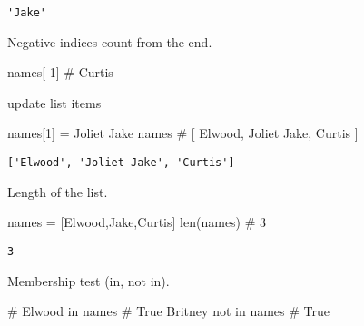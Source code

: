 \documentclass[
  letterpaper,
  DIV=11,
  numbers=noendperiod]{scrreprt}
\newenvironment{Shaded}{\begin{snugshade}}{\end{snugshade}}
\newcommand{\BuiltInTok}[1]{\textcolor[rgb]{0.00,0.46,0.62}{#1}}
\newcommand{\CommentTok}[1]{\textcolor[rgb]{0.37,0.37,0.37}{#1}}
\newcommand{\DecValTok}[1]{\textcolor[rgb]{0.68,0.00,0.00}{#1}}
\newcommand{\KeywordTok}[1]{\textcolor[rgb]{0.00,0.46,0.62}{#1}}
\newcommand{\NormalTok}[1]{\textcolor[rgb]{0.00,0.46,0.62}{#1}}
\newcommand{\OperatorTok}[1]{\textcolor[rgb]{0.37,0.37,0.37}{#1}}
\newcommand{\StringTok}[1]{\textcolor[rgb]{0.13,0.47,0.30}{#1}}
\begin{document}
\begin{verbatim}
'Jake'
\end{verbatim}

Negative indices count from the end.

\begin{Shaded}
\begin{Highlighting}[]
\NormalTok{names[}\OperatorTok{{-}}\DecValTok{1}\NormalTok{] }\CommentTok{\# \textquotesingle{}Curtis\textquotesingle{}}
\end{Highlighting}
\end{Shaded}

update list items

\begin{Shaded}
\begin{Highlighting}[]
\NormalTok{names[}\DecValTok{1}\NormalTok{] }\OperatorTok{=} \StringTok{\textquotesingle{}Joliet Jake\textquotesingle{}}
\NormalTok{names                     }\CommentTok{\# [ \textquotesingle{}Elwood\textquotesingle{}, \textquotesingle{}Joliet Jake\textquotesingle{}, \textquotesingle{}Curtis\textquotesingle{} ]}
\end{Highlighting}
\end{Shaded}

\begin{verbatim}
['Elwood', 'Joliet Jake', 'Curtis']
\end{verbatim}

Length of the list.

\begin{Shaded}
\begin{Highlighting}[]
\NormalTok{names }\OperatorTok{=}\NormalTok{ [}\StringTok{\textquotesingle{}Elwood\textquotesingle{}}\NormalTok{,}\StringTok{\textquotesingle{}Jake\textquotesingle{}}\NormalTok{,}\StringTok{\textquotesingle{}Curtis\textquotesingle{}}\NormalTok{]}
\BuiltInTok{len}\NormalTok{(names)  }\CommentTok{\# 3}
\end{Highlighting}
\end{Shaded}

\begin{verbatim}
3
\end{verbatim}

Membership test (in, not in).

\begin{Shaded}
\begin{Highlighting}[]
\CommentTok{\# \textquotesingle{}Elwood\textquotesingle{} in names       \# True}
\CommentTok{\textquotesingle{}Britney\textquotesingle{}} \KeywordTok{not} \KeywordTok{in}\NormalTok{ names  }\CommentTok{\# True}
\end{Highlighting}
\end{Shaded}
\end{document}
